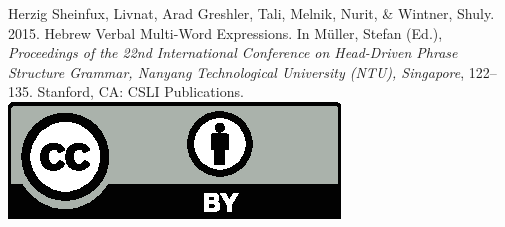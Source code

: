 \documentclass[a4paper,11pt]{article}
\begin{document}
\noindent



\vfill
\noindent
Herzig Sheinfux, Livnat, Arad Greshler, Tali, Melnik, Nurit, \& Wintner, Shuly. 2015. Hebrew Verbal Multi-Word Expressions. In Müller, Stefan (Ed.), \emph{{Proceedings of the 22nd International Conference on Head-Driven Phrase Structure Grammar, Nanyang Technological University (NTU), Singapore}}, 122--135. Stanford,
CA: CSLI Publications. \hfill\href{http://creativecommons.org/licenses/by/4.0/}{\includegraphics[height=.75em]{Includes/ccby.eps}}

\newpage

        
\end{document}
